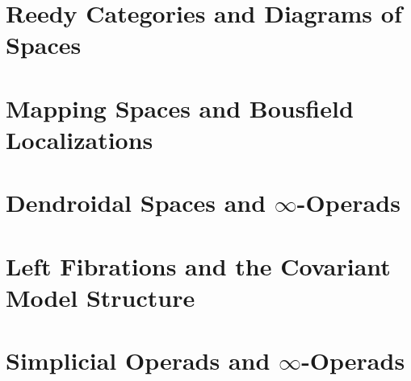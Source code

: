 \documentclass[11pt, a4paper]{article}
\begin{document}
\section{Reedy Categories and Diagrams of Spaces}

\section{Mapping Spaces and Bousfield Localizations}

\section{Dendroidal Spaces and $\infty$-Operads}

\section{Left Fibrations and the Covariant Model Structure}

\section{Simplicial Operads and $\infty$-Operads}

\end{document}

